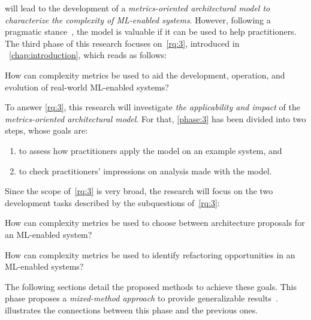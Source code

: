    will lead to the development of a \emph{metrics-oriented
  architectural model to characterize the complexity of ML-enabled systems}.
  However, following a pragmatic stance~\parencite{Easterbrook2008SelectingEngineering}, 
  the model is valuable if it can be used to help practitioners.
  The third phase of this research focuses on~\cref{rq:3}, introduced in%
  ~\cref{chap:introduction}, which reads as follows:
  \begin{revisitresearchquestion}{3}
      How can complexity metrics be used to aid the development,
      operation, and evolution of real-world ML-enabled systems?
  \end{revisitresearchquestion}
  
  To answer \cref{rq:3}, this research will investigate \emph{the
  applicability and impact} of the \emph{metrics-oriented architectural model}.
  For that, \cref{phase:3} has been divided into two steps, whose goals are:
  \begin{enumerate}[label=\theMethPhase.\arabic*.]
      \item to assess how practitioners apply the model on an example system, and
      \item to check practitioners' impressions on analysis made with the model.
  \end{enumerate}
  Since the scope of~\cref{rq:3} is very broad, the research will focus on the
  two development tasks described by the subquestions of~\cref{rq:3}:
  \begin{revisitresearchquestion}{3.1}
      How can complexity metrics be used to choose between architecture
      proposals for an ML-enabled system?
  \end{revisitresearchquestion}%
  \vspace{-\baselineskip}%
  \begin{revisitresearchquestion}{3.2}
      How can complexity metrics be used to identify refactoring
      opportunities in an ML-enabled systems?
  \end{revisitresearchquestion}
  The following sections detail the proposed methods to achieve these goals.
  This phase proposes a \emph{mixed-method approach} to provide generalizable
  results~\parencite{Easterbrook2008SelectingEngineering}.%
  ~ illustrates the connections between this
  phase and the previous ones.

